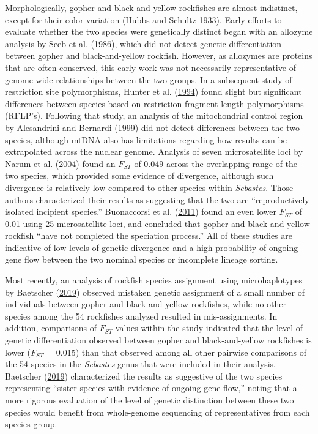 \documentclass[12pt,]{article}
\begin{document}
Morphologically, gopher and black-and-yellow rockfishes are almost
indistinct, except for their color variation (Hubbs and Schultz
\protect\hyperlink{ref-Hubbs1933}{1933}). Early efforts to evaluate
whether the two species were genetically distinct began with an allozyme
analysis by Seeb et al. (\protect\hyperlink{ref-Seeb1986}{1986}), which
did not detect genetic differentiation between gopher and
black-and-yellow rockfish. However, as allozymes are proteins that are
often conserved, this early work was not necessarily representative of
genome-wide relationships between the two groups. In a subsequent study
of restriction site polymorphisms, Hunter et al.
(\protect\hyperlink{ref-Hunter1994}{1994}) found slight but significant
differences between species based on restriction fragment length
polymorphisms (RFLP's). Following that study, an analysis of the
mitochondrial control region by Alesandrini and Bernardi
(\protect\hyperlink{ref-Alesandrini1999}{1999}) did not detect
differences between the two species, although mtDNA also has limitations
regarding how results can be extrapolated across the nuclear genome.
Analysis of seven microsatellite loci by Narum et al.
(\protect\hyperlink{ref-Narum2004}{2004}) found an \(F_{ST}\) of 0.049
across the overlapping range of the two species, which provided some
evidence of divergence, although such divergence is relatively low
compared to other species within \emph{Sebastes}. Those authors
characterized their results as suggesting that the two are
``reproductively isolated incipient species.'' Buonaccorsi et al.
(\protect\hyperlink{ref-Buonaccorsi2011}{2011}) found an even lower
\(F_{ST}\) of 0.01 using 25 microsatellite loci, and concluded that
gopher and black-and-yellow rockfish ``have not completed the speciation
process.'' All of these studies are indicative of low levels of genetic
divergence and a high probability of ongoing gene flow between the two
nominal species or incomplete lineage sorting.

Most recently, an analysis of rockfish species assignment using
microhaplotypes by Baetscher
(\protect\hyperlink{ref-Baetscher2019}{2019}) observed mistaken genetic
assignment of a small number of individuals between gopher and
black-and-yellow rockfishes, while no other species among the 54
rockfishes analyzed resulted in mis-assignments. In addition,
comparisons of \(F_{ST}\) values within the study indicated that the
level of genetic differentiation observed between gopher and
black-and-yellow rockfishes is lower (\(F_{ST}\) = 0.015) than that
observed among all other pairwise comparisons of the 54 species in the
\emph{Sebastes} genus that were included in their analysis. Baetscher
(\protect\hyperlink{ref-Baetscher2019}{2019}) characterized the results
as suggestive of the two species representing ``sister species with
evidence of ongoing gene flow,'' noting that a more rigorous evaluation
of the level of genetic distinction between these two species would
benefit from whole-genome sequencing of representatives from each
species group.
\end{document}
